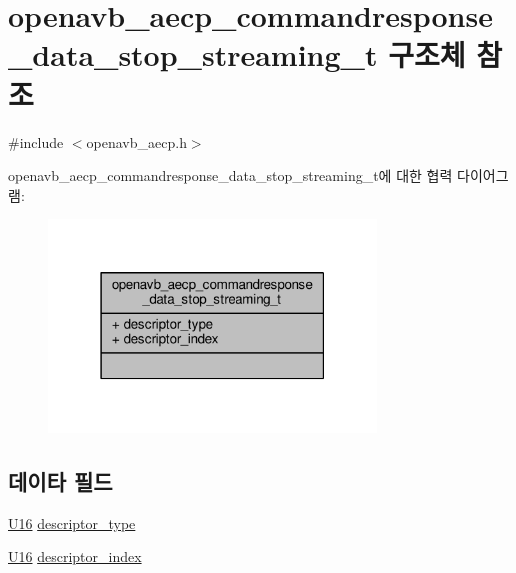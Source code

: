 \hypertarget{structopenavb__aecp__commandresponse__data__stop__streaming__t}{}\section{openavb\+\_\+aecp\+\_\+commandresponse\+\_\+data\+\_\+stop\+\_\+streaming\+\_\+t 구조체 참조}
\label{structopenavb__aecp__commandresponse__data__stop__streaming__t}


{\ttfamily \#include $<$openavb\+\_\+aecp.\+h$>$}



openavb\+\_\+aecp\+\_\+commandresponse\+\_\+data\+\_\+stop\+\_\+streaming\+\_\+t에 대한 협력 다이어그램\+:
\nopagebreak
\begin{figure}[H]
\begin{center}
\leavevmode
\includegraphics[width=247pt]{structopenavb__aecp__commandresponse__data__stop__streaming__t__coll__graph}
\end{center}
\end{figure}
\subsection*{데이타 필드}
\begin{DoxyCompactItemize}
\item 
\hyperlink{openavb__types__base__pub_8h_a0a0a322d5fa4a546d293a77ba8b4a71f}{U16} \hyperlink{structopenavb__aecp__commandresponse__data__stop__streaming__t_a1e231d7874aada5925b29affc76782cc}{descriptor\+\_\+type}
\item 
\hyperlink{openavb__types__base__pub_8h_a0a0a322d5fa4a546d293a77ba8b4a71f}{U16} \hyperlink{structopenavb__aecp__commandresponse__data__stop__streaming__t_ab26fb363c24b9a2a4391f9171c981b08}{descriptor\+\_\+index}
\end{DoxyCompactItemize}


